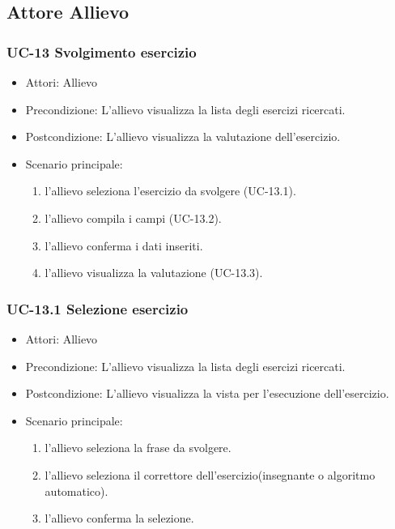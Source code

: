 \newpage


					
					
					
\subsection{Attore Allievo}
	\subsubsection{UC-13 Svolgimento esercizio}
	\begin{itemize}
	\item Attori: Allievo
			\item Precondizione:  L'allievo visualizza la lista degli esercizi ricercati.
			\item Postcondizione: L'allievo visualizza la valutazione dell'esercizio.
			\item Scenario principale:
			\begin{enumerate}
				\item l'allievo seleziona l'esercizio da svolgere (UC-13.1).
				\item l'allievo compila i campi (UC-13.2).
				\item l'allievo conferma i dati inseriti.
				\item l'allievo visualizza la valutazione (UC-13.3).
			\end{enumerate}
	\end{itemize}
			
	\subsubsection{UC-13.1 Selezione esercizio}
	\begin{itemize}
			\item Attori: Allievo
			\item Precondizione: L'allievo visualizza la lista degli esercizi ricercati.
			\item Postcondizione: L'allievo visualizza la vista per l'esecuzione dell'esercizio.
			\item Scenario principale:
				\begin{enumerate}
					\item l'allievo seleziona la frase da svolgere.
					\item l'allievo seleziona il correttore dell'esercizio(insegnante o algoritmo automatico).
					\item l'allievo conferma la selezione.
				\end{enumerate}
			\end{itemize}

